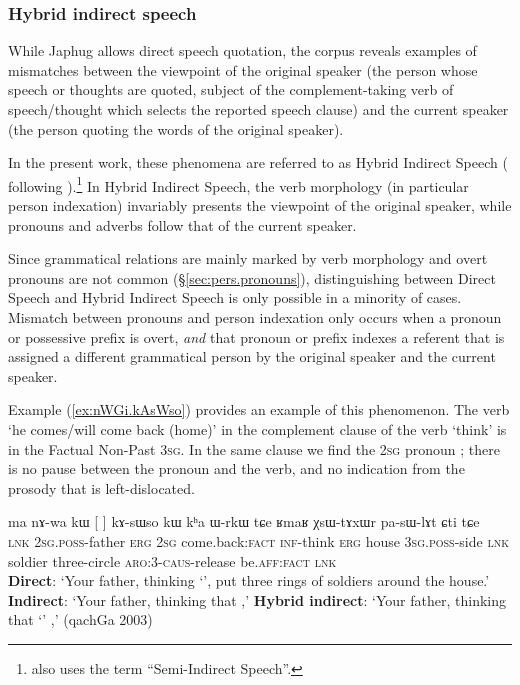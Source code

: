 \subsubsection{Hybrid indirect speech} \label{sec:hybrid indirect}
While Japhug allows direct speech quotation, the corpus reveals examples of mismatches between the viewpoint of the original speaker (the person whose speech or thoughts are quoted, subject of the com\-ple\-ment-taking verb of speech/thought which selects the reported speech clause) and the current speaker (the person quoting the words of the original speaker).

In the present work, these phenomena are referred to as Hybrid Indirect Speech (\citealt{jacques16complementation} following \citet{tournadre08conjunct}).\footnote{\citet{aikhenvald08semidirect} also uses the term ``Semi-Indirect Speech''. } In Hybrid Indirect Speech, the verb morphology (in particular person indexation) invariably presents the viewpoint of the original speaker, while pronouns and adverbs follow that of the current speaker.

Since grammatical relations are mainly marked by verb morphology and overt pronouns are not common (§\ref{sec:pers.pronouns}), distinguishing between Direct Speech and Hybrid Indirect Speech is only possible in a minority of cases. Mismatch between pronouns and person indexation only occurs when a pronoun or possessive prefix is overt, \textit{and} that pronoun or prefix indexes a referent that is assigned a different grammatical person by the  original speaker and the current speaker.
 
   
Example (\ref{ex:nWGi.kAsWso}) provides an example of this phenomenon. The verb  `he comes/will come back (home)' in the complement clause of the verb  `think' is in the Factual Non-Past \textsc{3sg}. In the same clause we find the \textsc{2sg} pronoun ; there is no pause between the pronoun and the verb, and no indication from the prosody that  is left-dislocated. 


\begin{exe}
\ex \label{ex:nWGi.kAsWso}
\gll ma nɤ-wa kɯ [ 	]  kɤ-sɯso kɯ kʰa ɯ-rkɯ tɕe ʁmaʁ χsɯ-tɤxɯr pa-sɯ-lɤt ɕti tɕe \\
\textsc{lnk} \textsc{2sg}.\textsc{poss}-father \textsc{erg} \textsc{2sg} {come.back:\textsc{fact}}  \textsc{inf}-think \textsc{erg} house \textsc{3sg}.\textsc{poss}-side \textsc{lnk} soldier three-circle \textsc{aro}:3\flobv{}-\textsc{caus}-release be.\textsc{aff}:\textsc{fact} \textsc{lnk}\\
\glt \textbf{Direct}: `Your father, thinking `', put three rings of soldiers around the house.' 
\glt  \textbf{Indirect}: `Your father, thinking that ,'
\glt  \textbf{Hybrid indirect}: `Your father, thinking that `' ,' (qachGa 2003)
\end{exe}

